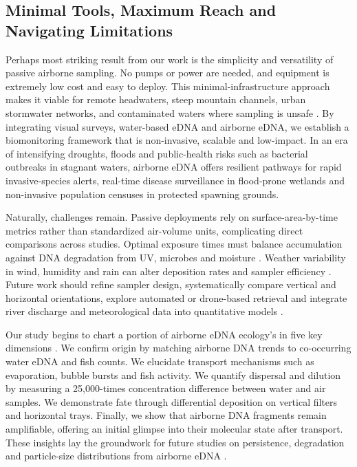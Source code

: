\documentclass{article}
\begin{document}
\subsection{Minimal Tools, Maximum Reach and Navigating Limitations}
Perhaps most striking result from our work is the simplicity and versatility of passive airborne sampling. No pumps or power are needed, and equipment is extremely low cost and easy to deploy. This minimal-infrastructure approach makes it viable for remote headwaters, steep mountain channels, urban stormwater networks, and contaminated waters where sampling is unsafe \cite{harrison2019,bagley2019}. By integrating visual surveys, water-based eDNA and airborne eDNA, we establish a biomonitoring framework that is non-invasive, scalable and low-impact. In an era of intensifying droughts, floods and public-health risks such as bacterial outbreaks in stagnant waters, airborne eDNA offers resilient pathways for rapid invasive-species alerts, real-time disease surveillance in flood-prone wetlands and non-invasive population censuses in protected spawning grounds.

Naturally, challenges remain. Passive deployments rely on surface-area-by-time metrics rather than standardized air-volume units, complicating direct comparisons across studies. Optimal exposure times must balance accumulation against DNA degradation from UV, microbes and moisture \cite{brandao-dias2023}. Weather variability in wind, humidity and rain can alter deposition rates and sampler efficiency \cite{johnson2023,johnson2024}. Future work should refine sampler design, systematically compare vertical and horizontal orientations, explore automated or drone-based retrieval and integrate river discharge and meteorological data into quantitative models \cite{galban2021,kirchgeorg2024,shogren2017,wood2021}.

Our study begins to chart a portion of airborne eDNA ecology's in five key dimensions \cite{johnson2024}. We confirm origin by matching airborne DNA trends to co-occurring water eDNA and fish counts. We elucidate transport mechanisms such as evaporation, bubble bursts and fish activity. We quantify dispersal and dilution by measuring a 25,000-times concentration difference between water and air samples. We demonstrate fate through differential deposition on vertical filters and horizontal trays. Finally, we show that airborne DNA fragments remain amplifiable, offering an initial glimpse into their molecular state after transport. These insights lay the groundwork for future studies on persistence, degradation and particle-size distributions from airborne eDNA \cite{brandao-dias2025a}.
\end{document}
